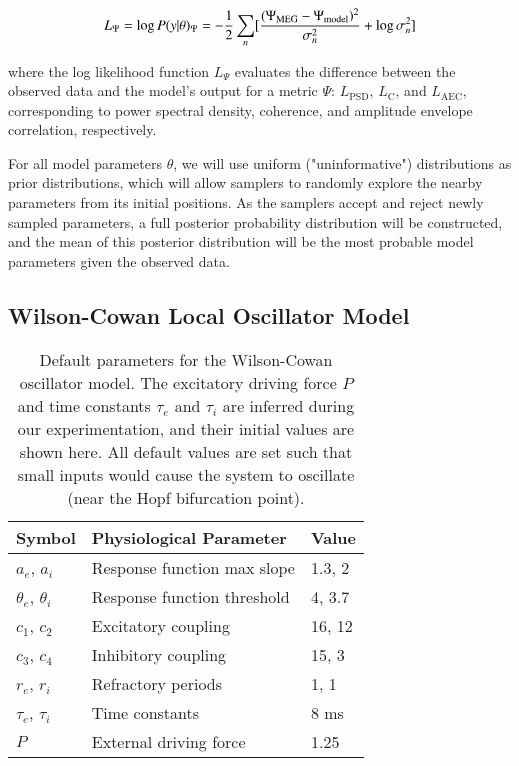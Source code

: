 \begin{equation}
\label{eq:ll}
    L_{\Psi} = \log P(y | \theta)_{\Psi} = - \frac{1}{2} \sum_n [\frac{(\Psi_{\textrm{MEG}} - \Psi_{\textrm{model}})^2}{\sigma_n^2} + \log \sigma_n^2] \\
\end{equation}

where the log likelihood function $L_{\Psi}$ evaluates the difference between the observed data and the model's output for a metric $\Psi$: $L_{\textrm{PSD}}$, $L_{\textrm{C}}$, and $L_{\textrm{AEC}}$, corresponding to power spectral density, coherence, and amplitude envelope correlation, respectively.

For all model parameters $\theta$, we will use uniform ("uninformative") distributions as prior distributions, which will allow samplers to randomly explore the nearby parameters from its initial positions. As the samplers accept and reject newly sampled parameters, a full posterior probability distribution will be constructed, and the mean of this posterior distribution will be the most probable model parameters given the observed data.

\subsection{Wilson-Cowan Local Oscillator Model}

\begin{table}[]
    \centering
    \caption{Default parameters for the Wilson-Cowan oscillator model. The excitatory driving force $P$ and time constants $\tau_e$ and $\tau_i$ are inferred during our experimentation, and their initial values are shown here. All default values are set such that small inputs would cause the system to oscillate (near the Hopf bifurcation point).}
    \begin{tabular}{lll}
    \toprule
    \cmidrule(r){1-2}
    Symbol                 &  Physiological Parameter     & Value \\
    \midrule
    $a_e$, $a_i$           &  Response function max slope & 1.3, 2 \\
    $\theta_e$, $\theta_i$ &  Response function threshold & 4, 3.7 \\
    $c_1$, $c_2$           &  Excitatory coupling         & 16, 12 \\
    $c_3$, $c_4$           &  Inhibitory coupling         & 15, 3  \\
    $r_e$, $r_i$           &  Refractory periods          & 1, 1 \\
    $\tau_e$, $\tau_i$     &  Time constants              & 8 ms \\
    $P$                    &  External driving force      & 1.25 \\
    \bottomrule
    \end{tabular}
    \label{tab:oscillator_parameters}
\end{table}

